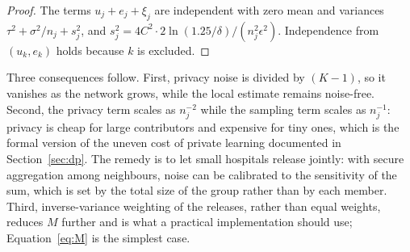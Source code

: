 \documentclass[acmsmall,screen,review]{acmart}
\theoremstyle{acmdefinition}
\begin{document}
\begin{proof}
The terms $u_j+e_j+\xi_j$ are independent with zero mean and variances $\tau^2+\sigma^2/n_j+s_j^2$, and $s_j^2=4C^2\cdot 2\ln(1.25/\delta)/(n_j^2\epsilon^2)$. Independence from $(u_k,e_k)$ holds because $k$ is excluded.
\end{proof}

Three consequences follow. First, privacy noise is divided by $(K-1)$, so it vanishes as the network grows, while the local estimate remains noise-free. Second, the privacy term scales as $n_j^{-2}$ while the sampling term scales as $n_j^{-1}$: privacy is cheap for large contributors and expensive for tiny ones, which is the formal version of the uneven cost of private learning documented in Section~\ref{sec:dp}. The remedy is to let small hospitals release jointly: with secure aggregation \cite{bonawitz2017practical} among neighbours, noise can be calibrated to the sensitivity of the sum, which is set by the total size of the group rather than by each member. Third, inverse-variance weighting of the releases, rather than equal weights, reduces $M$ further and is what a practical implementation should use; Equation~\eqref{eq:M} is the simplest case.
\end{document}
